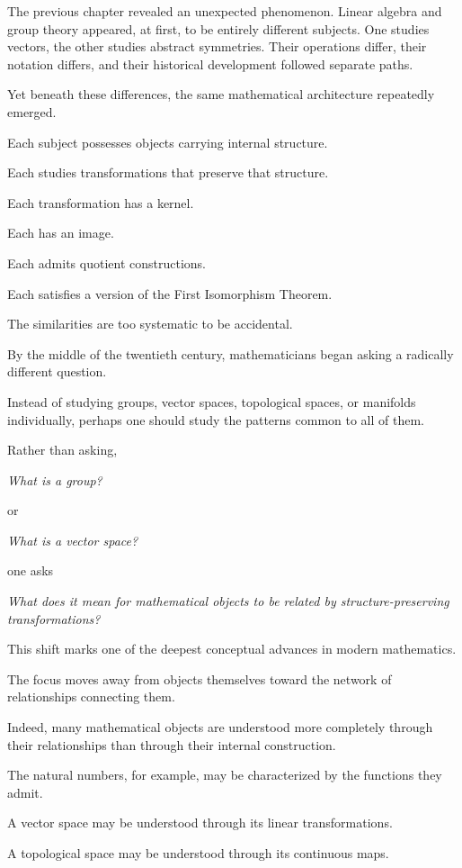 \documentclass[11pt]{book}
\numberwithin{equation}{chapter}
\theoremstyle{definition}
\theoremstyle{plain}
\theoremstyle{remark}
\begin{document}
The previous chapter revealed an unexpected phenomenon. Linear algebra and group theory appeared, at first, to be entirely different subjects. One studies vectors, the other studies abstract symmetries. Their operations differ, their notation differs, and their historical development followed separate paths.

Yet beneath these differences, the same mathematical architecture repeatedly emerged.

Each subject possesses objects carrying internal structure.

Each studies transformations that preserve that structure.

Each transformation has a kernel.

Each has an image.

Each admits quotient constructions.

Each satisfies a version of the First Isomorphism Theorem.

The similarities are too systematic to be accidental.

By the middle of the twentieth century, mathematicians began asking a radically different question.

Instead of studying groups, vector spaces, topological spaces, or manifolds individually, perhaps one should study the patterns common to all of them.

Rather than asking,

\emph{What is a group?}

or

\emph{What is a vector space?}

one asks

\emph{What does it mean for mathematical objects to be related by structure-preserving transformations?}

This shift marks one of the deepest conceptual advances in modern mathematics.

The focus moves away from objects themselves toward the network of relationships connecting them.

Indeed, many mathematical objects are understood more completely through their relationships than through their internal construction.

The natural numbers, for example, may be characterized by the functions they admit.

A vector space may be understood through its linear transformations.

A topological space may be understood through its continuous maps.
\end{document}
